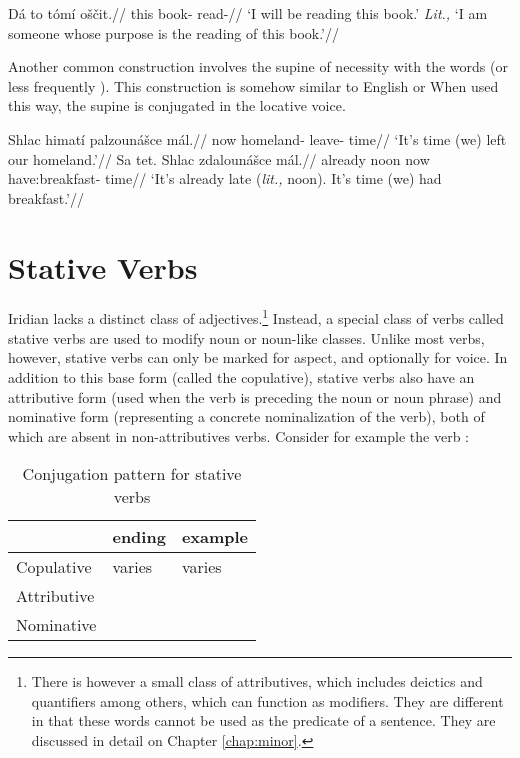 \pex
\begingl
\gla Dá to t\'om\'i oščit.//
\glb {} this book- read-//
\glft `I will be reading this book.' \emph{Lit.,} `I am someone whose purpose is the reading of this book.'//
\endgl
\xe

Another common construction involves the supine of necessity with the words   (or less frequently ). This construction is somehow similar to English  or  When used this way, the supine is conjugated in the locative voice.

\pex
\begingl
\gla Shlac himatí palzounášce mál.//
\glb now homeland- leave- time//
\glft `It's time (we) left our homeland.'//
\endgl
\xe
\pex
\begingl
\gla Sa tet. Shlac zdalounášce mál.//
\glb already noon now have:breakfast- time//
\glft `It's already late (\emph{lit.,} noon). It's time (we) had breakfast.'//
\endgl
\xe

\section{Stative Verbs}\label{sec:statives}

Iridian lacks a distinct class of adjectives.\footnote{There is however a small class of attributives, which includes deictics and quantifiers among others, which can function as modifiers. They are different in that these words cannot be used as the predicate of a sentence. They are discussed in detail on Chapter \ref{chap:minor}.} Instead, a special class of verbs called {\sc stative verbs} are used to modify noun or noun-like classes. Unlike most verbs, however, stative verbs can only be marked for aspect, and optionally for voice. In addition to this base form (called the {\sc copulative}), stative verbs also have an {\sc attributive} form (used when the verb is preceding the noun or noun phrase) and {\sc nominative} form (representing a concrete nominalization of the verb), both of which are absent in non-attributives verbs. Consider for example the verb  :

\begin{table}[h!]
	\small
	\caption{Conjugation pattern for stative verbs}
	\medskip
	\begin{tabu} to 0.7\textwidth{YY[0.8]Y}
		\toprule
		&{\sc ending}&{\sc example}\\
		\midrule
		Copulative & varies & varies\\
		Attributive &  & \\
		Nominative & 	& \\
		\bottomrule
	\end{tabu}
\end{table}

